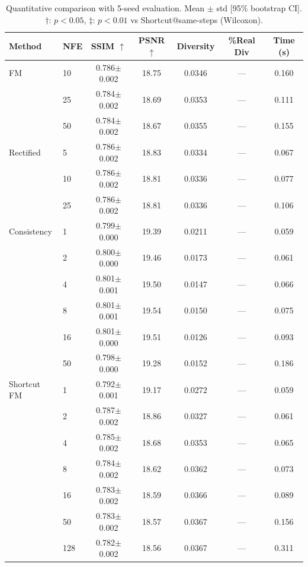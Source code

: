 \begin{table}[t]
\centering
\caption{Quantitative comparison with 5-seed evaluation. Mean $\pm$ std [95\% bootstrap CI]. $\dagger$: $p<0.05$, $\ddagger$: $p<0.01$ vs Shortcut@same-steps (Wilcoxon).}
\label{tab:main_5seed}
\footnotesize
\begin{tabular}{llccccc}
\toprule
Method & NFE & SSIM $\uparrow$ & PSNR $\uparrow$ & Diversity & \%Real Div & Time (s) \\
\midrule
  FM & 10 & 0.786$\pm$0.002 & 18.75 & 0.0346 & — & 0.160 \\
   & 25 & 0.784$\pm$0.002 & 18.69 & 0.0353 & — & 0.111 \\
   & 50 & 0.784$\pm$0.002 & 18.67 & 0.0355 & — & 0.155 \\
\midrule
  Rectified & 5 & 0.786$\pm$0.002 & 18.83 & 0.0334 & — & 0.067 \\
   & 10 & 0.786$\pm$0.002 & 18.81 & 0.0336 & — & 0.077 \\
   & 25 & 0.786$\pm$0.002 & 18.81 & 0.0336 & — & 0.106 \\
\midrule
  Consistency & 1 & 0.799$\pm$0.000 & 19.39 & 0.0211 & — & 0.059 \\
   & 2 & 0.800$\pm$0.000 & 19.46 & 0.0173 & — & 0.061 \\
   & 4 & 0.801$\pm$0.001 & 19.50 & 0.0147 & — & 0.066 \\
   & 8 & 0.801$\pm$0.001 & 19.54 & 0.0150 & — & 0.075 \\
   & 16 & 0.801$\pm$0.000 & 19.51 & 0.0126 & — & 0.093 \\
   & 50 & 0.798$\pm$0.000 & 19.28 & 0.0152 & — & 0.186 \\
\midrule
  Shortcut FM & 1 & 0.792$\pm$0.001 & 19.17 & 0.0272 & — & 0.059 \\
   & 2 & 0.787$\pm$0.002 & 18.86 & 0.0327 & — & 0.061 \\
   & 4 & 0.785$\pm$0.002 & 18.68 & 0.0353 & — & 0.065 \\
   & 8 & 0.784$\pm$0.002 & 18.62 & 0.0362 & — & 0.073 \\
   & 16 & 0.783$\pm$0.002 & 18.59 & 0.0366 & — & 0.089 \\
   & 50 & 0.783$\pm$0.002 & 18.57 & 0.0367 & — & 0.156 \\
   & 128 & 0.782$\pm$0.002 & 18.56 & 0.0367 & — & 0.311 \\
\bottomrule
\end{tabular}
\end{table}